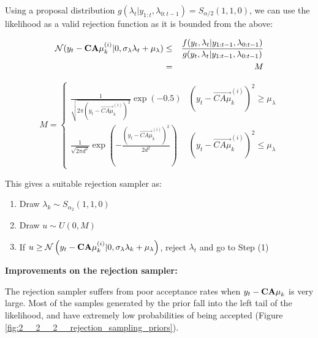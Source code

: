 \documentclass[../main.tex]{subfiles}
\begin{document}
%    
%    
%
%

Using a proposal distribution $g(\lambda_t | y_{1:t}, \lambda_{0:t-1}) = S_{\alpha/2}(1,1,0)$, we can use the likelihood as a valid rejection function as it is bounded from the above:

\begin{eqnarray}
\mathcal{N}(y_t - {\bf CA\mu}_k^{(i)} | 0, \sigma_\lambda \lambda_t + \mu_\lambda) & \leq & \frac{f(y_t, \lambda_t | y_{1:t-1}, \lambda_{0:t-1})}{g(y_t, \lambda_t | y_{1:t-1}, \lambda_{0:t-1})} \notag \\
& = & M \notag           
\end{eqnarray}

\begin{equation}
M = \begin{cases}
\frac{1}{\sqrt{2 \pi (y_t - \vec{CA\mu}_k^{(i)})^2}} \exp (-0.5) &  (y_t - \vec{CA\mu}_k^{(i)})^2 \geq \mu_\lambda \\
\frac{1}{\sqrt{2 \pi d^2}} \exp{ \left( -\frac{(y_t - \vec{CA\mu}_k^{(i)})^2}{2d^2} \right) } & (y_t - \vec{CA\mu}_k^{(i)})^2 \leq \mu_\lambda
\end{cases}
\end{equation}

This gives a suitable rejection sampler as:

\begin{enumerate}
	\item Draw $\lambda_k \sim S_{\alpha_2}(1,1,0)$
	\item Draw $ u \sim U ( 0, M )$
	\item If $u \geq \mathcal{N}\left( y_t - {\bf CA\mu}_k^{(i)} | 0, \sigma_\lambda \lambda_k + \mu_\lambda \right)$, reject $\lambda_t$ and go to Step (1)
\end{enumerate}


\textbf{Improvements on the rejection sampler:}

The rejection sampler suffers from poor acceptance rates when $y_t - {\bf CA\mu}_k$ is very large. Most of the samples generated by the prior fall into the left tail of the likelihood, and have extremely low probabilities of being accepted (Figure \ref{fig:2__2__2__rejection_sampling_priors}). 
\end{document}
